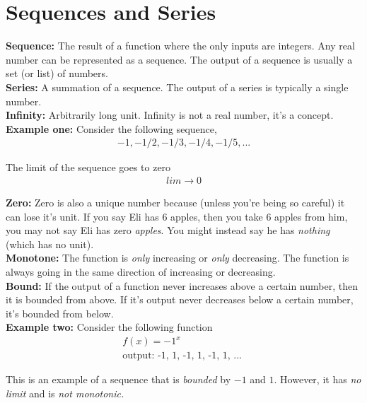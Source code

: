 \documentclass{article}
\begin{document}
\section{Sequences and Series}

\textbf{Sequence:} The result of a function where the only inputs are integers. Any real number can be represented as a sequence. The output of a sequence is usually a set (or list) of numbers. \\

\textbf{Series:} A summation of a sequence. The output of a series is typically a single number. \\

\textbf{Infinity:} Arbitrarily long unit. Infinity is not a real number, it's a concept. \\

\textbf{Example one: } Consider the following sequence, 
\begin{align*}
    -1, -1/2, -1/3, -1/4, -1/5,...
\end{align*}

The limit of the sequence goes to zero 
\begin{align*}
    lim \rightarrow 0
\end{align*}

\textbf{Zero:} Zero is also a unique number because (unless you're being so careful) it can lose it's unit. If you say Eli has 6 apples, then you take 6 apples from him, you may not say Eli has zero \textit{apples}. You might instead say he has \textit{nothing} (which has no unit). \\

\textbf{Monotone:} The function is \textit{only} increasing or \textit{only} decreasing. The function is always going in the same direction of increasing or decreasing. \\

\textbf{Bound:} If the output of a function never increases above a certain number, then it is bounded from above. If it's output never decreases below a certain number, it's bounded from below. \\

\textbf{Example two:} Consider the following function 
\begin{align*}
    f(x) = -1^x\\
    \text{output: -1, 1, -1, 1, -1, 1, ... } 
\end{align*}

This is an example of a sequence that is \textit{bounded} by $-1$ and $1$. However, it has \textit{ no limit} and is \textit{not monotonic.}\\
\end{document}
